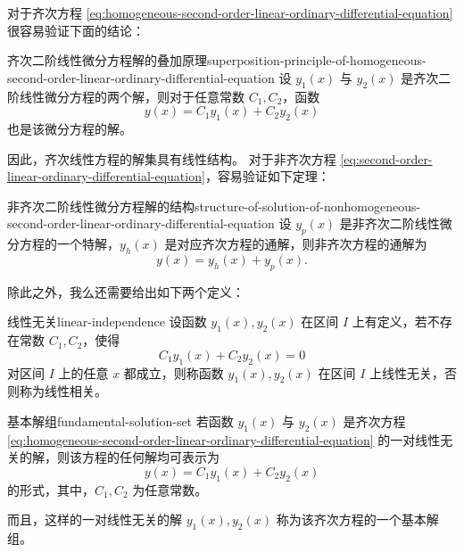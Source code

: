\bigskip

对于齐次方程 \cref{eq:homogeneous-second-order-linear-ordinary-differential-equation} 很容易验证下面的结论：
\begin{theorem}{齐次二阶线性微分方程解的叠加原理}{superposition-principle-of-homogeneous-second-order-linear-ordinary-differential-equation}
    设 $ y_1 (x) $ 与 $ y_2 (x) $ 是齐次二阶线性微分方程的两个解，则对于任意常数 $ C_1 , C_2 $，函数
    \begin{equation*}
        y(x) = C_1 y_1 (x) + C_2 y_2 (x)
    \end{equation*}
    也是该微分方程的解。
\end{theorem}

因此，齐次线性方程的解集具有线性结构。
对于非齐次方程 \cref{eq:second-order-linear-ordinary-differential-equation}，容易验证如下定理：
\begin{theorem}{非齐次二阶线性微分方程解的结构}{structure-of-solution-of-nonhomogeneous-second-order-linear-ordinary-differential-equation}
    设 $ y_p (x) $ 是非齐次二阶线性微分方程的一个特解，$ y_h (x) $ 是对应齐次方程的通解，则非齐次方程的通解为
    \begin{equation*}
        y(x) = y_h (x) + y_p (x) .
    \end{equation*}
\end{theorem}

除此之外，我么还需要给出如下两个定义：
\begin{definition}{线性无关}{linear-independence}
    设函数 $ y_1 (x) , y_2 (x) $ 在区间 $ I $ 上有定义，若不存在常数 $ C_1 , C_2 $，使得
    \begin{equation*}
        C_1 y_1 (x) + C_2 y_2 (x) = 0
    \end{equation*}
    对区间 $ I $ 上的任意 $ x $ 都成立，则称函数 $ y_1 (x) , y_2 (x) $ 在区间 $ I $ 上线性无关，否则称为线性相关。
\end{definition}

\begin{definition}{基本解组}{fundamental-solution-set}
    若函数 $ y_1 (x) $ 与 $ y_2 (x) $ 是齐次方程 \cref{eq:homogeneous-second-order-linear-ordinary-differential-equation} 的一对线性无关的解，则该方程的任何解均可表示为
    \begin{equation*}
        y(x) = C_1 y_1 (x) + C_2 y_2 (x)
    \end{equation*}
    的形式，其中，$ C_1 , C_2 $ 为任意常数。

    而且，这样的一对线性无关的解 $ y_1 (x) , y_2 (x) $ 称为该齐次方程的一个基本解组。
\end{definition}

